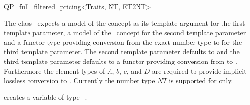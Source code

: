 \begin{ccRefClass}{QP_full_filtered_pricing<Traits, NT, ET2NT>}

\ccInheritsFrom
{}

\ccRequirements
\ccIndexRequirements

The class \ccRefName\ expects a model of the concept
 as its template argument for the first template parameter,
a model of the \cgal \ concept  for the second template
parameter and a functor type
providing conversion from the exact number type  to 
for the third template parameter. The second template parameter defaults to
 and the third template parameter defaults to a functor providing
conversion from  to . Furthermore the element types
of $A$, $b$, $c$, and $D$ are required to provide implicit lossless conversion
to . Currently the number type $NT$ is supported for  only.  


\ccTypes \ccIndexClassTypes


\ccCreation
\ccIndexClassCreation
{}

{creates a variable of type \ccRefName\ .}


\ccUnchecked

\ccAccessFunctions
\begin{ccIndexMemberFunctions}




\ccModifiers
{}





\end{ccIndexMemberFunctions}

\ccSeeAlso
%


\end{ccRefClass}
